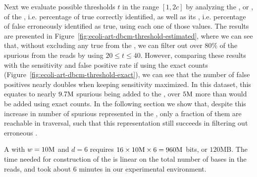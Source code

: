 Next we evaluate possible thresholds $t$ in the range $[1, 2c]$ by analyzing the , or , of the \dBCM, i.e. percentage of true  correctly identified, as well as its , i.e. percentage of false  erroneously identified as true, using each one of those values. The results are presented in Figure~\ref{fig:ecoli-art-dbcm-threshold-estimated}, where we can see that, without excluding any true  from the \dBG, we can filter out over $80\%$ of the spurious  from the reads by using $20 \leq t \leq 40$. However, comparing these results with the sensitivity and false positive rate if using the exact counts (Figure~\ref{fig:ecoli-art-dbcm-threshold-exact}), we can see that the number of false positives nearly doubles when keeping sensitivity maximized. In this dataset, this equates to nearly $9.7\mega$ spurious  being added to the \dBG, over $5\mega$ more than would be added using exact counts. In the following section we show that, despite this increase in number of spurious  represented in the \dBCM, only a fraction of them are reachable in traversal, such that this representation still succeeds in filtering out erroneous .

A \dBCM with $w = 10\mega$ and $d = 6$ requires $16 \times 10\mega \times 6 = 960\mega$ bits, or $120$MB. The time needed for construction of the \dBCM is linear on the total number of bases in the reads, and took about $6$ minutes in our experimental environment.


